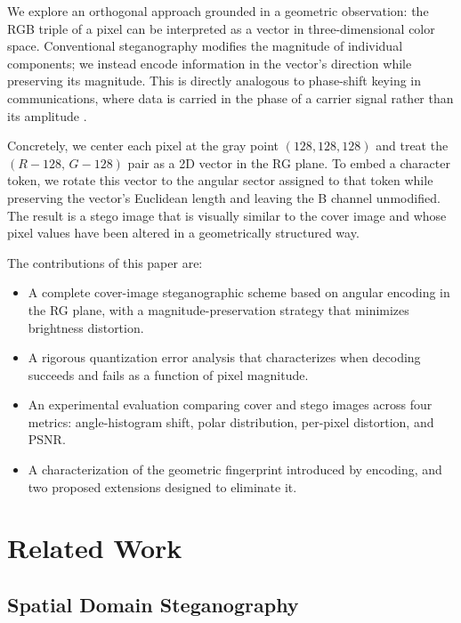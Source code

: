 \documentclass[12pt]{article}
\begin{document}
We explore an orthogonal approach grounded in a geometric observation: the
RGB triple of a pixel can be interpreted as a vector in three-dimensional
color space. Conventional steganography modifies the magnitude of individual
components; we instead encode information in the vector's direction while
preserving its magnitude. This is directly analogous to phase-shift keying
in communications, where data is carried in the phase of a carrier signal
rather than its amplitude \cite{johnson2001steganography}.

Concretely, we center each pixel at the gray point $(128, 128, 128)$ and
treat the $(R{-}128,\,G{-}128)$ pair as a 2D vector in the RG plane. To
embed a character token, we rotate this vector to the angular sector
assigned to that token while preserving the vector's Euclidean length and
leaving the B channel unmodified. The result is a stego image that is
visually similar to the cover image and whose pixel values have been altered
in a geometrically structured way.

The contributions of this paper are:
\begin{itemize}
    \item A complete cover-image steganographic scheme based on angular
          encoding in the RG plane, with a magnitude-preservation strategy
          that minimizes brightness distortion.
    \item A rigorous quantization error analysis that characterizes when
          decoding succeeds and fails as a function of pixel magnitude.
    \item An experimental evaluation comparing cover and stego images across
          four metrics: angle-histogram shift, polar distribution, per-pixel
          distortion, and PSNR.
    \item A characterization of the geometric fingerprint introduced by
          encoding, and two proposed extensions designed to eliminate it.
\end{itemize}

\section{Related Work}
\label{sec:related}

\subsection{Spatial Domain Steganography}
\end{document}
